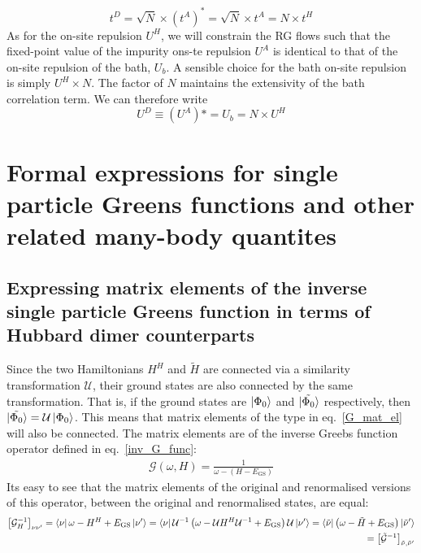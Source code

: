 \documentclass{report}
\numberwithin{equation}{section}
\begin{document}
\[ t^D = \sqrt N \times (t^A)^* = \sqrt N \times t^A = N \times t^H \]
As for the on-site repulsion $U^H$, we will constrain the RG flows such that the fixed-point value of the impurity ons-te repulsion $U^A$ is identical to that of the on-site repulsion of the bath, $U_b$. A sensible choice for the bath on-site repulsion is simply $U^H\times N$. The factor of $N$ maintains the extensivity of the bath correlation term. We can therefore write
\[U^D \equiv (U^A)* = U_b = N \times U^H\]
\section{Formal expressions for single particle Greens functions and other related many-body quantites}
\subsection{Expressing matrix elements of the inverse single particle Greens function in terms of Hubbard dimer counterparts}
Since the two Hamiltonians $H^H$ and $\tilde H$ are connected via a similarity transformation $\mathcal{U}$, their ground states are also connected by the same transformation. That is, if the ground states are $\ket{\Phi_0}$ and $\ket{\tilde{\Phi_0}}$ respectively, then $\ket{\tilde{\Phi_0}} = \mathcal{U}\ket{\Phi_0}$. This means that matrix elements of the type in eq.~\ref{G_mat_el} will also be connected. The matrix elements are of the inverse Greebs function operator defined in eq.~\ref{inv_G_func}:
 \begin{equation}\begin{aligned}
	 \mathcal{G}(\omega, H) = \frac{1}{\omega - (H - E_\text{GS})}
 \end{aligned}\end{equation}
Its easy to see that the matrix elements of the original and renormalised versions of this operator, between the original and renormalised states, are equal:
\begin{equation}\begin{aligned}
	\left[\mathcal{G}_H^{-1}\right]_{\nu \nu^\prime} = \bra{\nu}\omega - H^H + E_\text{GS}\ket{\nu^\prime} = \bra{\nu} \mathcal{U}^{-1}\left(\omega -  \mathcal{U} H^H  \mathcal{U}^{-1} + E_\text{GS}\right)  \mathcal{U}\ket{\nu^\prime} = \bra{\tilde \nu}\left(\omega - \tilde H + E_\text{GS}\right)\ket{\tilde \nu^\prime}\\
	= \left[\mathcal{\tilde G}^{-1}\right]_{\tilde \nu,\tilde \nu^\prime}
\end{aligned}\end{equation}
\end{document}

